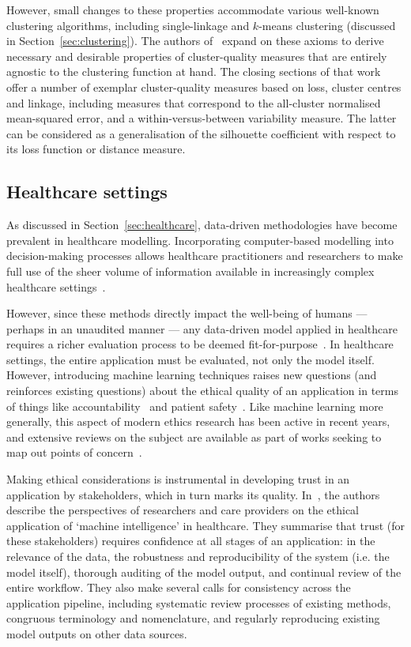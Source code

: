 However, small changes to these properties accommodate various well-known
clustering algorithms, including single-linkage and \(k\)-means clustering
(discussed in Section~\ref{sec:clustering}). The authors
of~\cite{BenDavid2008} expand on these axioms to derive necessary and desirable
properties of cluster-quality measures that are entirely agnostic to the
clustering function at hand. The closing sections of that work offer a number of
exemplar cluster-quality measures based on loss, cluster centres and linkage,
including measures that correspond to the all-cluster normalised mean-squared
error, and a within-versus-between variability measure. The latter can be
considered as a generalisation of the silhouette coefficient with respect to its
loss function or distance measure.

\subsection{Healthcare settings}

As discussed in Section~\ref{sec:healthcare}, data-driven methodologies have
become prevalent in healthcare modelling. Incorporating computer-based modelling
into decision-making processes allows healthcare practitioners and researchers
to make full use of the sheer volume of information available in increasingly
complex healthcare
settings~\cite{Alexander2018,Belle2015,Taranu2016,Tomar2013,Tsui2015}.

However, since these methods directly impact the well-being of humans ---
perhaps in an unaudited manner --- any data-driven model applied in healthcare
requires a richer evaluation process to be deemed
fit-for-purpose~\cite{Boaz2003,Gerhards2020,Ho2020}. In healthcare settings, the
entire application must be evaluated, not only the model itself. However,
introducing machine learning techniques raises new questions (and reinforces
existing questions) about the ethical quality of an application in terms of
things like
accountability~\cite{McCradden2020accountability,Ross2017,Zawati2020} and
patient safety~\cite{Habli2020,McCradden2020safety,Sittig2015}. Like machine
learning more generally, this aspect of modern ethics research has been active
in recent years, and extensive reviews on the subject are available as part of
works seeking to map out points of
concern~\cite{Char2020,Grote2020,Obermeyer2016,Rajkomar2019}.

Making ethical considerations is instrumental in developing trust in an
application by stakeholders, which in turn marks its quality.
In~\cite{Cutillo2020}, the authors describe the perspectives of researchers and
care providers on the ethical application of `machine intelligence' in
healthcare. They summarise that trust (for these stakeholders) requires
confidence at all stages of an application: in the relevance of the data, the
robustness and reproducibility of the system (i.e. the model itself), thorough
auditing of the model output, and continual review of the entire workflow. They
also make several calls for consistency across the application pipeline,
including systematic review processes of existing methods, congruous terminology
and nomenclature, and regularly reproducing existing model outputs on other data
sources.

